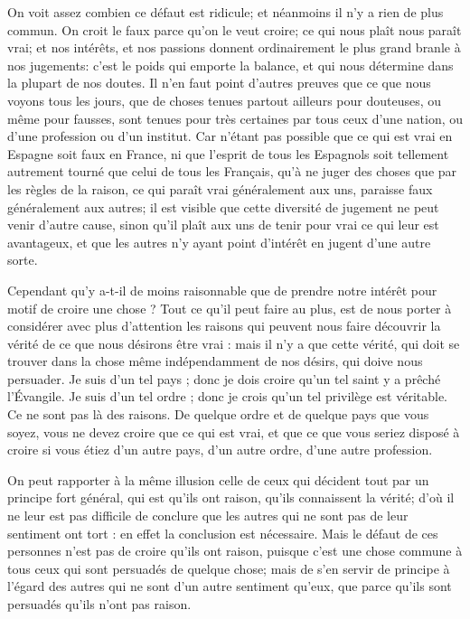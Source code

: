 On voit assez combien ce défaut est ridicule; et néanmoins il n'y a rien de plus commun. On croit le faux parce qu'on le veut croire; ce qui nous plaît nous paraît vrai; et nos intérêts, et nos passions donnent ordinairement le plus grand branle à nos jugements: c'est le poids qui emporte la balance, et qui nous détermine dans la plupart de nos doutes. Il n'en faut point d'autres preuves que ce que nous voyons tous les jours, que de choses tenues partout ailleurs pour douteuses, ou même pour fausses, sont tenues pour très certaines par tous ceux d'une nation, ou d'une profession ou d'un institut. Car n'étant pas possible que ce qui est vrai en Espagne soit faux en France, ni que l'esprit de tous les Espagnols soit tellement autrement tourné que celui de tous les Français, qu'à ne juger des choses que par les règles de la raison, ce qui paraît vrai généralement aux uns, paraisse faux généralement aux autres; il est visible que cette diversité de jugement ne peut venir d'autre cause, sinon qu'il plaît aux uns de tenir pour vrai ce qui leur est avantageux, et que les autres n'y ayant point d'intérêt en jugent d'une autre sorte.

Cependant qu'y a-t-il de moins raisonnable que de prendre notre intérêt pour motif de croire une chose ? Tout ce qu'il peut faire au plus, est de nous porter à considérer avec plus d'attention les raisons qui peuvent nous faire découvrir la vérité de ce que nous désirons être vrai : mais il n'y a que cette vérité, qui doit se trouver dans la chose même indépendamment de nos désirs, qui doive nous persuader. Je suis d'un tel pays ; donc je dois croire qu'un tel saint y a prêché l'Évangile. Je suis d'un tel ordre ; donc je crois qu'un tel privilège est véritable. Ce ne sont pas là des raisons. De quelque ordre et de quelque pays que vous soyez, vous ne devez croire que ce qui est vrai, et que ce que vous seriez disposé à croire si vous étiez d'un autre pays, d'un autre ordre, d'une autre profession.

On peut rapporter à la même illusion celle de ceux qui décident tout par un principe fort général, qui est qu'ils ont raison, qu'ils connaissent la vérité; d'où il ne leur est pas difficile de conclure que les autres qui ne sont pas de leur sentiment ont tort : en effet la conclusion est nécessaire. Mais le défaut de ces personnes n'est pas de croire qu'ils ont raison, puisque c'est une chose commune à tous ceux qui sont persuadés de quelque chose; mais de s'en servir de principe à l'égard des autres qui ne sont d'un autre sentiment qu'eux, que parce qu'ils sont persuadés qu'ils n'ont pas raison.

